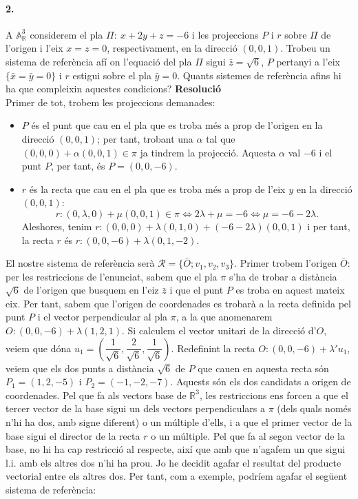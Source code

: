 \documentclass[11pt]{article}
\newcommand{\af}{\mathbb{A}}
\begin{document}
\paragraph{2.}	A $\af^3_{\mathbb{R}}$ considerem el pla $\Pi:\ x + 2y + z = -6$ i les projeccions $P$ i $r$ sobre $\Pi$ de l'origen i l'eix ${x = z = 0}$, respectivament, en la direcció $(0, 0, 1)$. Trobeu un sistema de referència afí on l'equació del
pla $\Pi$ sigui $\bar{z}=\sqrt{6}$, $P$ pertanyi a l'eix $\{\bar{x} = \bar{y} = 0\}$ i $r$ estigui sobre el pla $\bar{y} = 0$. Quants sistemes de referència afins hi ha que compleixin aquestes condicions?
\textbf{Resolució}\\
Primer de tot, trobem les projeccions demanades:
\begin{itemize}
	\item $P$ és el punt que cau en el pla que es troba més a prop de l'origen en la direcció $(0,0,1)$; per tant, trobant una $\alpha$ tal que $(0,0,0)+\alpha(0,0,1)\in\pi$ ja tindrem la projecció. Aquesta $\alpha$ val $-6$ i el punt $P$, per tant, és $P=(0,0,-6)$.
	\item $r$ és la recta que cau en el pla que es troba més a prop de l'eix $y$ en la direcció $(0,0,1)$:
	$$
	r:(0,\lambda,0)+\mu(0,0,1)\in\pi\iff2\lambda+\mu=-6\iff\mu=-6-2\lambda.
	$$
	Aleshores, tenim $r:(0,0,0)+\lambda(0,1,0)+(-6-2\lambda)(0,0,1)$ i per tant, la recta $r$ és $r:(0,0,-6)+\lambda(0,1,-2)$.
\end{itemize}
El nostre sistema de referència serà $\mathcal{R}=\{\bar{O};v_1,v_2,v_3\}$. Primer trobem l'origen $\bar{O}$: per les restriccions de l'enunciat, sabem que el pla $\pi$ s'ha de trobar a distància $\sqrt{6}$ de l'origen que busquem en l'eiz $\bar{z}$ i que el punt $P$ es troba en aquest mateix eix. Per tant, sabem que l'origen de coordenades es trobarà a la recta definida pel punt $P$ i el vector perpendicular al pla $\pi$, a la que anomenarem $O:(0,0,-6)+\lambda(1,2,1)$. Si calculem el vector unitari de la direcció d'$O$, veiem que dóna $u_1=\left(\dfrac{1}{\sqrt{6}},\dfrac{2}{\sqrt{6}},\dfrac{1}{\sqrt{6}}\right)$. Redefinint la recta $O:(0,0,-6)+\lambda' u_1$, veiem que els dos punts a distància $\sqrt{6}$ de $P$ que cauen en aquesta recta són $P_1=(1,2,-5)$ i $P_2=(-1,-2,-7)$. Aquests són els dos candidats a origen de coordenades. Pel que fa als vectors base de $\mathbb{R}^3$, les restriccions ens forcen a que el tercer vector de la base sigui un dels vectors perpendiculars a $\pi$ (dels quals només n'hi ha dos, amb signe diferent) o un múltiple d'ells, i a que el primer vector de la base sigui el director de la recta $r$ o un múltiple. Pel que fa al segon vector de la base, no hi ha cap restricció al respecte, així que amb que n'agafem un que sigui l.i. amb els altres dos n'hi ha prou. Jo he decidit agafar el resultat del producte vectorial entre els altres dos. Per tant, com a exemple, podríem agafar el següent sistema de referència:
\end{document}
